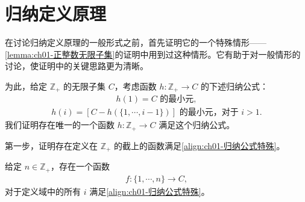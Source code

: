 \documentclass[../../main.tex]{subfiles}
\begin{document}
\section{归纳定义原理}\label{section:ch01-归纳定义原理}

在讨论归纳定义原理的一般形式之前，首先证明它的一个特殊情形——\cref{lemma:ch01-正整数无限子集}的证明中用到过这种情形。它有助于对一般情形的讨论，使证明中的关键思路更为清晰。

为此，给定 $\mathbb{Z}_{+}$ 的无限子集 $C$，考虑函数 $h: \mathbb{Z}_{+} \longrightarrow C$ 的下述归纳公式：
\begin{align}
h(1) = C \text{ 的最小元},\label{align:ch01-归纳公式特殊}
\end{align}
\begin{align*}
h(i) = [C - h(\{1, \cdots, i-1\})] \text{ 的最小元，对于 } i > 1.
\end{align*}
我们证明存在唯一的一个函数 $h: \mathbb{Z}_{+} \longrightarrow C$ 满足这个归纳公式。

第一步，证明存在定义在 $\mathbb{Z}_{+}$ 的截上的函数满足\eqref{align:ch01-归纳公式特殊}。

\begin{lemma}\label{lemma:ch01-截上归纳}
给定 $n \in \mathbb{Z}_{+}$，存在一个函数
\begin{align*}
f: \{1, \cdots, n\} \longrightarrow C,
\end{align*}
对于定义域中的所有 $i$ 满足\eqref{align:ch01-归纳公式特殊}。
\end{lemma}
\end{document}
